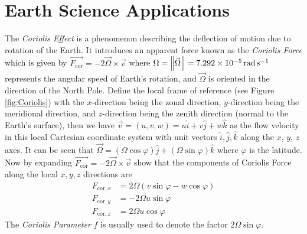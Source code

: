 \section{Earth Science Applications}
\begin{exmp}
\label{exmp:Coriolis}
The \textit{Coriolis Effect} is a phenomenon describing the deflection of motion due to rotation of the Earth. It introduces an apparent force known as the \textit{Coriolis Force} which is given by $\overrightarrow{F_\text{cor}} = -2\vec{\Omega} \times \vec{v}$ where $\Omega = \norm{\vec{\Omega}} = \SI{7.292e-5}{\radian \per \s}$ represents the angular speed of Earth's rotation, and $\vec{\Omega}$ is oriented in the direction of the North Pole. Define the local frame of reference (see Figure \ref{fig:Coriolis}) with the $x$-direction being the zonal direction, $y$-direction being the meridional direction, and $z$-direction being the zenith direction (normal to the Earth's surface), then we have $\vec{v} = (u,v,w) = u\hat{i} + v\hat{j} + w\hat{k}$ as the flow velocity in this local Cartesian coordinate system with unit vectors $\hat{i}, \hat{j}, \hat{k}$ along the $x$, $y$, $z$ axes. It can be seen that $\vec{\Omega} = (\Omega \cos\varphi) \hat{j} + (\Omega \sin \varphi) \hat{k}$ where $\varphi$ is the latitude. Now by expanding $\overrightarrow{F_\text{cor}} = -2\vec{\Omega} \times \vec{v}$ show that the components of Coriolis Force along the local $x,y,z$ directions are
\begin{align*}
F_{\text{cor},x} &= 2\Omega (v\sin\varphi - w\cos\varphi) \\
F_{\text{cor},y} &= -2\Omega u \sin\varphi \\
F_{\text{cor},z} &= 2\Omega u \cos\varphi
\end{align*}
The \textit{Coriolis Parameter} $f$ is usually used to denote the factor $2\Omega\sin\varphi$.
\end{exmp}
